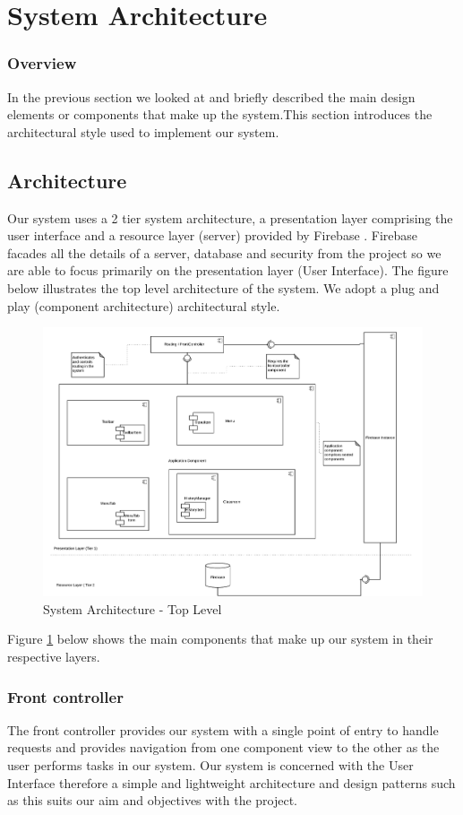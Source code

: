 \section{System Architecture}
\subsubsection{Overview}
In the previous section we looked at and briefly described the main design elements or components that make up the system.This section introduces the architectural style used to implement our system. 
\subsection{Architecture}
Our system uses a 2 tier system architecture, a presentation layer comprising the user interface and a resource layer (server) provided by Firebase \cite{website:Firebase}. Firebase facades all the details of a server, database and security from the project so we are able to focus primarily on the presentation layer (User Interface). The figure below illustrates the top level architecture of the system. We adopt a plug and play (component architecture) architectural style. 
\begin{figure}[!ht]
\caption{System Architecture - Top Level}
    \label{fig:SystemArchitecture}
    \centering
    \includegraphics[scale=0.5]{figures/SystemArch}
\end{figure}
Figure \ref{fig:SystemArchitecture} below shows the main components that make up our system in their respective layers.
\subsubsection{Front controller}
The front controller provides our system with a single point of entry to handle requests and provides navigation from one component view to the other as the user performs tasks in our system. Our system is concerned with the User Interface therefore a simple and lightweight architecture and design patterns such as this suits our aim and objectives with the project.

